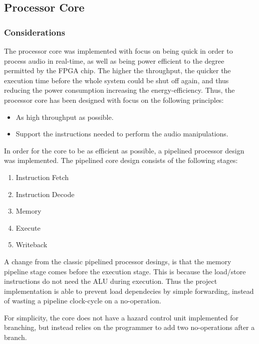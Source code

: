\FloatBarrier
\subsection{Processor Core}\label{subsec:fpga-processor-core}

\subsubsection{Considerations}

The processor core was implemented with focus on being quick in order to process
audio in real-time, as well as being power efficient to the degree permitted by
the FPGA chip. The higher the throughput, the quicker the execution time before
the whole system could be shut off again, and thus reducing the power
consumption increasing the energy-efficiency. Thus, the processor core has been
designed with focus on the following principles:

\begin{itemize}
	\item As high throughput as possible.
	\item Support the instructions needed to perform the audio manipulations.
\end{itemize}

In order for the core to be as efficient as possible, a pipelined processor
design was implemented. The pipelined core design consists of the following
stages:

\begin{enumerate}
	\item Instruction Fetch \label{stage:if}
	\item Instruction Decode \label{stage:id}
	\item Memory \label{stage:mem}
	\item Execute \label{stage:ex}
	\item Writeback \label{stage:wb}
\end{enumerate}

A change from the classic pipelined processor desings, is that the memory
pipeline stage comes before the execution stage. This is because the load/store
instructions do not need the ALU during execution. Thus the project
implementation is able to prevent load dependecies by simple forwarding, instead
of wasting a pipeline clock-cycle on a no-operation.

For simplicity, the core does not have a hazard control unit implemented for
branching, but instead relies on the programmer to add two no-operations after a
branch.

